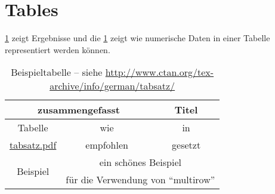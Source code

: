 \section{Tables}
\cref{tab:Ergebnisse} zeigt Ergebnisse und die \cref{tab:Ergebnisse} zeigt wie numerische Daten in einer Tabelle representiert werden können.
\begin{table}
  \centering
  \begin{tabular}{ccc}
    \toprule
    \multicolumn{2}{c}{\textbf{zusammengefasst}} & \textbf{Titel}                                                          \\ \midrule
    Tabelle                                      & wie                                                           & in      \\
    \url{tabsatz.pdf}                            & empfohlen                                                     & gesetzt \\

    \multirow{2}{*}{Beispiel}                    & \multicolumn{2}{c}{ein schönes Beispiel}                                \\
                                                 & \multicolumn{2}{c}{für die Verwendung von \enquote{multirow}}           \\
    \bottomrule
  \end{tabular}
  \caption[Beispieltabelle]{Beispieltabelle -- siehe \url{http://www.ctan.org/tex-archive/info/german/tabsatz/}}
  \label{tab:Ergebnisse}
\end{table}

